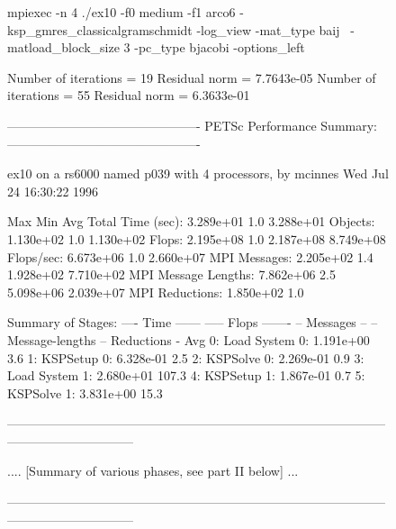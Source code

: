 \begin{figure}[tb]
  \begin{outputlisting}[\tiny\ttfamily] 
mpiexec -n 4 ./ex10 -f0 medium -f1 arco6 -ksp_gmres_classicalgramschmidt -log_view -mat_type baij \
            -matload_block_size 3 -pc_type bjacobi -options_left

Number of iterations =  19
Residual norm = 7.7643e-05
Number of iterations =  55
Residual norm = 6.3633e-01

---------------------------------------------- PETSc Performance Summary: ----------------------------------------------

ex10 on a rs6000 named p039 with 4 processors, by mcinnes Wed Jul 24 16:30:22 1996

                         Max         Min        Avg        Total
Time (sec):           3.289e+01      1.0   3.288e+01
Objects:              1.130e+02      1.0   1.130e+02
Flops:                2.195e+08      1.0   2.187e+08   8.749e+08
Flops/sec:            6.673e+06      1.0               2.660e+07
MPI Messages:         2.205e+02      1.4   1.928e+02   7.710e+02
MPI Message Lengths:  7.862e+06      2.5   5.098e+06   2.039e+07
MPI Reductions:       1.850e+02      1.0

Summary of Stages:  ---- Time ------  ----- Flops -------  -- Messages -- -- Message-lengths -- Reductions -
                      Avg      %
 0:  Load System 0: 1.191e+00    3.6%
 1:    KSPSetup 0:  6.328e-01    2.5%
 2:    KSPSolve 0:  2.269e-01    0.9%
 3:  Load System 1: 2.680e+01  107.3%
 4:    KSPSetup 1:  1.867e-01    0.7%
 5:    KSPSolve 1:  3.831e+00   15.3%

------------------------------------------------------------------------------------------------------------------------

.... [Summary of various phases, see part II below] ...

------------------------------------------------------------------------------------------------------------------------


\end{outputlisting}
\end{figure}
